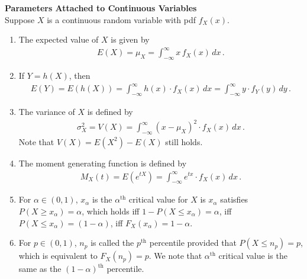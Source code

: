 \documentclass[11pt,oneside]{book}
\theoremstyle{newStyle}
\begin{document}
\newpage
\textbf{Parameters Attached to Continuous Variables}\\
Suppose $X$ is a continuous random variable with pdf $f_X(x)$. 
\begin{enumerate}
\item The expected value of $X$ is given by \begin{align*}
E(X)  = \mu_X = \int_{-\infty}^\infty x\, f_X(x)\, dx\,.
\end{align*}
\item If $Y = h(X)$, then 
\begin{align*}
E(Y) = E(h(X)) = \int_{-\infty}^\infty h(x) \cdot f_X(x) \, dx = \int_{-\infty}^\infty y\cdot f_Y(y) \, dy\,.
\end{align*}
\item The variance of $X$ is defined by 
\begin{align*}
\sigma_X^2 = V(X) = \int_{-\infty}^{\infty}(x-\mu_X)^2 \cdot f_X(x) \, dx \,.
\end{align*}
Note that $V(X) = E(X^2) - E(X)$ still holds. 
\item The moment generating function is defined by 
\begin{align*}
M_X(t) = E(e^{tX}) = \int_{-\infty}^\infty e^{tx} \cdot f_X(x) \, dx\,.
\end{align*}
\item For $\alpha \in (0 ,1)$, $x_\alpha$ is the $\alpha^\text{th}$ critical value for $X$ is $x_\alpha$ satisfies $P(X\geq x_\alpha) = \alpha$, which holds iff $1-P(X\leq x_\alpha) = \alpha$, iff $P(X\leq x_\alpha) = (1-\alpha)$, iff $F_X(x_\alpha) = 1-\alpha$. 
\item For $p \in (0,1)$, $n_p$ is called the $p^\text{th}$ percentile provided that $P(X\leq n_p) = p$, which is equivalent to $F_X(n_p) = p$. We note that $\alpha^\text{th}$ critical value is the same as the $(1-\alpha)^{\text{th}}$ percentile. 
\end{enumerate}
\end{document}
